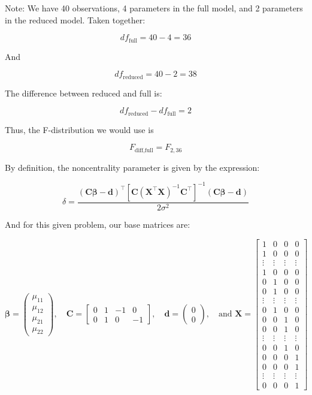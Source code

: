 \documentclass[
]{article}
\begin{document}
Note: We have 40 observations, 4 parameters in the full model, and 2
parameters in the reduced model. Taken together:

\[
df_{\text{full}} = 40 - 4 = 36
\]

And

\[
df_{\text{reduced}} = 40 - 2 = 38
\]

The difference between reduced and full is:

\[
df_{\text{reduced}} - df_{\text{full}} = 2
\]

Thus, the F-distribution we would use is

\[
F_{\text{diff}, \text{full}} = F_{2,36}
\]

By definition, the noncentrality parameter is given by the expression:

\[
\delta = \frac{(\boldsymbol{C} \boldsymbol{\beta} - \boldsymbol{d})^{\top} [\boldsymbol{C} (\boldsymbol{X}^{\top} \boldsymbol{X})^{-1} \boldsymbol{C}^{\top}]^{-1} (\boldsymbol{C} \boldsymbol{\beta} - \boldsymbol{d})}{2 \sigma^2}
\]

And for this given problem, our base matrices are:

\[
\boldsymbol{\beta} =
\begin{pmatrix}
\mu_{11} \\
\mu_{12} \\
\mu_{21} \\
\mu_{22}
\end{pmatrix},
\quad
\boldsymbol{C} =
\begin{bmatrix}
0 & 1 & -1 & 0 \\
0 & 1 & 0 & -1
\end{bmatrix},
\quad
\boldsymbol{d} =
\begin{pmatrix}
0 \\
0
\end{pmatrix}, 
\quad \text{and }
\boldsymbol{X} =
\begin{bmatrix}
1 & 0 & 0 & 0 \\
1 & 0 & 0 & 0 \\
\vdots & \vdots & \vdots & \vdots \\
1 & 0 & 0 & 0 \\
0 & 1 & 0 & 0 \\
0 & 1 & 0 & 0 \\
\vdots & \vdots & \vdots & \vdots \\
0 & 1 & 0 & 0 \\
0 & 0 & 1 & 0 \\
0 & 0 & 1 & 0 \\
\vdots & \vdots & \vdots & \vdots \\
0 & 0 & 1 & 0 \\
0 & 0 & 0 & 1 \\
0 & 0 & 0 & 1 \\
\vdots & \vdots & \vdots & \vdots \\
0 & 0 & 0 & 1
\end{bmatrix}
\]
\end{document}

